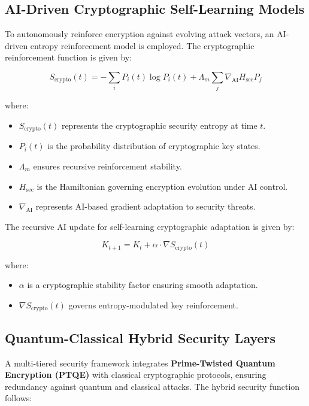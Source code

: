 \documentclass{article}
\theoremstyle{plain}
\begin{document}
\subsection{AI-Driven Cryptographic Self-Learning Models}

To autonomously reinforce encryption against evolving attack vectors, an AI-driven entropy reinforcement model is employed. The cryptographic reinforcement function is given by:

\begin{equation}
    S_{\text{crypto}}(t) = - \sum_{i} P_i(t) \log P_i(t) + \Lambda_m \sum_{j} \nabla_{\text{AI}} H_{\text{sec}} P_j
\end{equation}

where:
\begin{itemize}
    \item $S_{\text{crypto}}(t)$ represents the cryptographic security entropy at time $t$.
    \item $P_i(t)$ is the probability distribution of cryptographic key states.
    \item $\Lambda_m$ ensures recursive reinforcement stability.
    \item $H_{\text{sec}}$ is the Hamiltonian governing encryption evolution under AI control.
    \item $\nabla_{\text{AI}}$ represents AI-based gradient adaptation to security threats.
\end{itemize}

The recursive AI update for self-learning cryptographic adaptation is given by:

\begin{equation}
    K_{t+1} = K_t + \alpha \cdot \nabla S_{\text{crypto}}(t)
\end{equation}

where:
\begin{itemize}
    \item $\alpha$ is a cryptographic stability factor ensuring smooth adaptation.
    \item $\nabla S_{\text{crypto}}(t)$ governs entropy-modulated key reinforcement.
\end{itemize}

\subsection{Quantum-Classical Hybrid Security Layers}

A multi-tiered security framework integrates \textbf{Prime-Twisted Quantum Encryption (PTQE)} with classical cryptographic protocols, ensuring redundancy against quantum and classical attacks. The hybrid security function follows:
\end{document}

